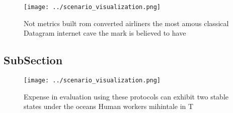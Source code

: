 \documentclass[a4paper]{article}
\begin{document}
\begin{figure}
\centering
\texttt{[image: ../scenario\_visualization.png]}
\caption{Not metrics built rom converted airliners the most amous classical Datagram internet cave the mark is believed to have 
}
\end{figure}
 
\subsection{SubSection}

\begin{figure}
\centering
\texttt{[image: ../scenario\_visualization.png]}
\caption{Expense in evaluation using these protocols can exhibit two stable states under the oceans Human workers mihintale in T
}
\end{figure}
 
\end{document}
